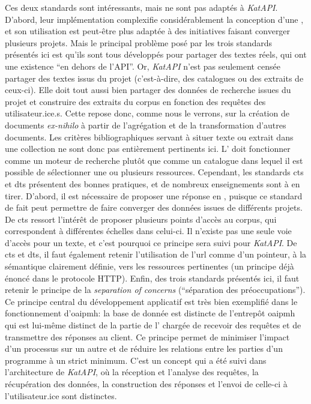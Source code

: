 Ces deux standards sont intéressants, mais ne sont pas adaptés à \textit{KatAPI}. D'abord, leur implémentation complexifie considérablement la conception d'une \api{}, et son utilisation est peut-être plus adaptée à des initiatives faisant converger plusieurs projets. Mais le principal problème posé par les trois standards présentés ici est qu'ils sont tous développés pour partager des textes réels, qui ont une existence \enquote{en dehors de l'API}. Or, \textit{KatAPI} n'est pas seulement censée partager des textes issus du projet (c'est-à-dire, des catalogues ou des extraits de ceux-ci). Elle doit tout aussi bien partager des données de recherche issues du projet et construire des extraits du corpus en fonction des requêtes des utilisateur.ice.s. Cette \api{} repose donc, comme nous le verrons, sur la création de documents \textit{ex-nihilo} à partir de l'agrégation et de la transformation d'autres documents. Les critères bibliographiques servant à situer texte ou extrait dans une collection ne sont donc pas entièrement pertinents ici. L'\api{} doit fonctionner comme un moteur de recherche plutôt que comme un catalogue dans lequel il est possible de sélectionner une ou plusieurs ressources. Cependant, les standards \gls{cts} et \gls{dts} présentent des bonnes pratiques, et de nombreux enseignements sont à en tirer. D'abord, il est nécessaire de proposer une réponse en \xmltei{}, puisque ce standard de fait peut permettre de faire converger des données issues de différents projets. De \gls{cts} ressort l'intérêt de proposer plusieurs points d'accès au corpus, qui correspondent à différentes échelles dans celui-ci. Il n'existe pas une seule voie d'accès pour un texte, et c'est pourquoi ce principe sera suivi pour \textit{KatAPI}. De \gls{cts} et \gls{dts}, il faut également retenir l'utilisation de l'\gls{url} comme d'un pointeur, à la sémantique clairement définie, vers les ressources pertinentes (un principe déjà énoncé dans le protocole HTTP). Enfin, des trois standards présentés ici, il faut retenir le principe de la \textit{separation of concerns} (\enquote{séparation des préoccupations}). Ce principe central du développement applicatif est très bien exemplifié dans le fonctionnement d'\gls{oaipmh}: la base de donnée est distincte de l'entrepôt \gls{oaipmh} qui est lui-même distinct de la partie de l'\api{} chargée de recevoir des requêtes et de transmettre des réponses au client. Ce principe permet de minimiser l'impact d'un processus sur un autre et de réduire les relations entre les parties d'un programme à un strict minimum. C'est un concept qui a été suivi dans l'architecture de \textit{KatAPI}, où la réception et l'analyse des requêtes, la récupération des données, la construction des réponses et l'envoi de celle-ci à l'utilisateur.ice sont distinctes.


